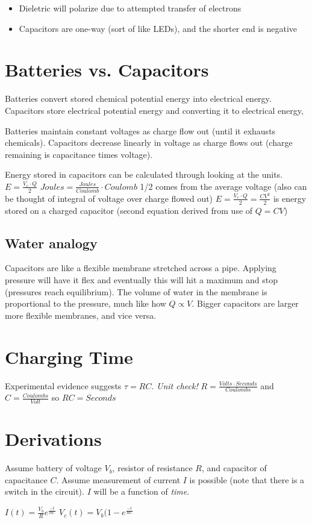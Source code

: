 \documentclass[letterpaper]{article}
\begin{document}
\begin{itemize}
\item Dieletric will polarize due to attempted transfer of electrons
\item Capacitors are one-way (sort of like LEDs), and the shorter end is negative
\end{itemize}

\section{Batteries vs. Capacitors}
\label{sec:org6691c92}
Batteries convert stored chemical potential energy into electrical energy.
Capacitors store electrical potential energy and converting it to electrical energy,

Batteries maintain constant voltages as charge flow out (until it exhausts chemicals).
Capacitors decrease linearly in voltage as charge flows out (charge remaining is capacitance times voltage).

Energy stored in capacitors can be calculated through looking at the units.
\(E = \frac{V_c \cdot Q}{2}\)
\(Joules = \frac{Joules}{Coulomb} \cdot Coulomb\)
1/2 comes from the average voltage (also can be thought of integral of voltage over charge flowed out)
\(E = \frac{V_c \cdot Q}{2} = \frac{CV^2}{2}\) is energy stored on a charged capacitor (second equation derived from use of \(Q = CV\))

\subsection{Water analogy}
\label{sec:orgf6498a0}
Capacitors are like a flexible membrane stretched across a pipe. Applying pressure will have it flex and eventually this will hit a maximum and stop (pressures reach equilibrium). The volume of water in the membrane is proportional to the pressure, much like how \(Q \propto V\). Bigger capacitors are larger more flexible membranes, and vice versa.

\section{Charging Time}
\label{sec:org37a34bb}
Experimental evidence suggests \(\tau = RC\). 
\emph{Unit check!} \(R = \frac{Volts \cdot Seconds}{Coulombs}\) and \(C = \frac{Coulombs}{Volt}\) so \(RC = Seconds\)

\section{Derivations}
\label{sec:org72efbae}
Assume battery of voltage \(V_b\), resistor of resistance \(R\), and capacitor of capacitance \(C\). Assume measurement of current \(I\) is possible (note that there is a switch in the circuit). \(I\) will be a function of \emph{time}.

\(I(t) = \frac{V_b}{R} e^{\frac{-t}{RC}}\)
\(V_c(t) = V_b (1 - e^{\frac{-t}{RC}}\)
\end{document}
